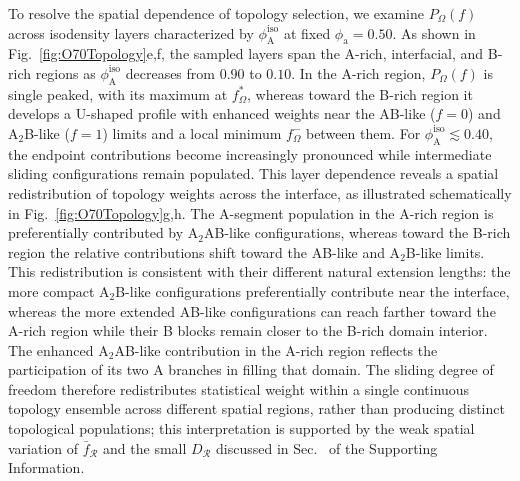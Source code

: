 To resolve the spatial dependence of topology selection, we examine $P_\Omega(f)$ across isodensity layers characterized by $\phi_{\mathrm A}^{\mathrm{iso}}$ at fixed $\phi_{\mathrm a}=0.50$.
As shown in Fig.~\ref{fig:O70Topology}e,f, the sampled layers span the A-rich, interfacial, and B-rich regions as $\phi_{\mathrm A}^{\mathrm{iso}}$ decreases from $0.90$ to $0.10$.
In the A-rich region, $P_\Omega(f)$ is single peaked, with its maximum at $f_\Omega^\ast$, whereas toward the B-rich region it develops a U-shaped profile with enhanced weights near the AB-like ($f=0$) and A$_2$B-like ($f=1$) limits and a local minimum $f_\Omega^-$ between them.
For $\phi_{\mathrm{A}}^{\mathrm{iso}} \lesssim 0.40$, the endpoint contributions become increasingly pronounced while intermediate sliding configurations remain populated.
This layer dependence reveals a spatial redistribution of topology weights across the interface, as illustrated schematically in Fig.~\ref{fig:O70Topology}g,h.
The A-segment population in the A-rich region is preferentially contributed by A$_2$AB-like configurations, whereas toward the B-rich region the relative contributions shift toward the AB-like and A$_2$B-like limits.
This redistribution is consistent with their different natural extension lengths: the more compact A$_2$B-like configurations preferentially contribute near the interface, whereas the more extended AB-like configurations can reach farther toward the A-rich region while their B blocks remain closer to the B-rich domain interior.
The enhanced A$_2$AB-like contribution in the A-rich region reflects the participation of its two A branches in filling that domain.
The sliding degree of freedom therefore redistributes statistical weight within a single continuous topology ensemble across different spatial regions, rather than producing distinct topological populations; this interpretation is supported by the weak spatial variation of $\bar f_{\mathcal R}$ and the small $D_{\mathcal R}$ discussed in Sec.~ of the Supporting Information.



